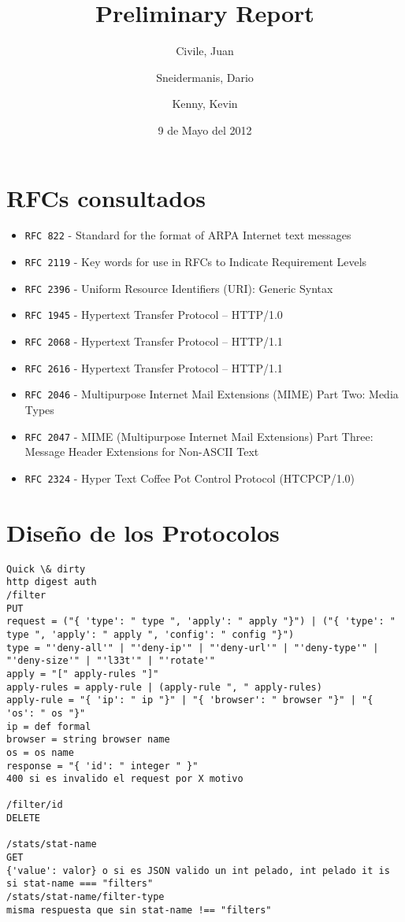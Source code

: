 \documentclass[11pt,a4paper,titlepage]{article}
\title{Preliminary Report}
\author{Civile, Juan \and Sneidermanis, Dario \and Kenny, Kevin}
\date{9 de Mayo del 2012}
\begin{document}
\newcommand{\awesome}[1]{\texttt{\large #1}}
\newcommand{\ua}{\textit{User Agent} }
\newcommand{\os}{\textit{Origin Server} }

\maketitle
\tableofcontents
\clearpage

\section{RFCs consultados}

\begin{itemize}

    \item \awesome{RFC 822}  - Standard for the format of ARPA Internet text messages
    \item \awesome{RFC 2119} - Key words for use in RFCs to Indicate Requirement Levels
    \item \awesome{RFC 2396} - Uniform Resource Identifiers (URI): Generic Syntax
    \item \awesome{RFC 1945} - Hypertext Transfer Protocol -- HTTP/1.0
    \item \awesome{RFC 2068} - Hypertext Transfer Protocol -- HTTP/1.1
    \item \awesome{RFC 2616} - Hypertext Transfer Protocol -- HTTP/1.1
    \item \awesome{RFC 2046} - Multipurpose Internet Mail Extensions (MIME) Part Two: Media Types
    \item \awesome{RFC 2047} - MIME (Multipurpose Internet Mail Extensions) Part Three: Message Header Extensions for Non-ASCII Text
    \item \awesome{RFC 2324} - Hyper Text Coffee Pot Control Protocol (HTCPCP/1.0)

\end{itemize}

\section{Diseño de los Protocolos}
\begin{verbatim}
Quick \& dirty
http digest auth
/filter
PUT 
request = ("{ 'type': " type ", 'apply': " apply "}") | ("{ 'type': " type ", 'apply': " apply ", 'config': " config "}")
type = "'deny-all'" | "'deny-ip'" | "'deny-url'" | "'deny-type'" | "'deny-size'" | "'l33t'" | "'rotate'"
apply = "[" apply-rules "]"
apply-rules = apply-rule | (apply-rule ", " apply-rules)
apply-rule = "{ 'ip': " ip "}" | "{ 'browser': " browser "}" | "{ 'os': " os "}"
ip = def formal
browser = string browser name
os = os name
response = "{ 'id': " integer " }"
400 si es invalido el request por X motivo

/filter/id
DELETE

/stats/stat-name
GET
{'value': valor} o si es JSON valido un int pelado, int pelado it is
si stat-name === "filters"
/stats/stat-name/filter-type
misma respuesta que sin stat-name !== "filters"
\end{verbatim}
\end{document}
